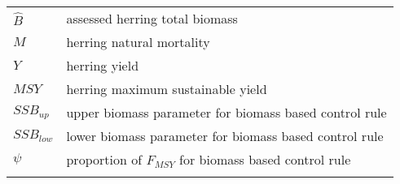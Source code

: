 \documentclass[]{article}
\begin{document}
\begin{longtable}[]{@{}ll@{}}
\begin{minipage}[t]{0.13\columnwidth}
\(\widehat{B}\)\strut
\end{minipage} & \begin{minipage}[t]{0.76\columnwidth}\raggedright\strut
assessed herring total biomass\strut
\end{minipage}\tabularnewline
\begin{minipage}[t]{0.13\columnwidth}\raggedright\strut
\(M\)\strut
\end{minipage} & \begin{minipage}[t]{0.76\columnwidth}\raggedright\strut
herring natural mortality\strut
\end{minipage}\tabularnewline
\begin{minipage}[t]{0.13\columnwidth}\raggedright\strut
\(Y\)\strut
\end{minipage} & \begin{minipage}[t]{0.76\columnwidth}\raggedright\strut
herring yield\strut
\end{minipage}\tabularnewline
\begin{minipage}[t]{0.13\columnwidth}\raggedright\strut
\(MSY\)\strut
\end{minipage} & \begin{minipage}[t]{0.76\columnwidth}\raggedright\strut
herring maximum sustainable yield\strut
\end{minipage}\tabularnewline
\begin{minipage}[t]{0.13\columnwidth}\raggedright\strut
\(SSB_{up}\)\strut
\end{minipage} & \begin{minipage}[t]{0.76\columnwidth}\raggedright\strut
upper biomass parameter for biomass based control rule\strut
\end{minipage}\tabularnewline
\begin{minipage}[t]{0.13\columnwidth}\raggedright\strut
\(SSB_{low}\)\strut
\end{minipage} & \begin{minipage}[t]{0.76\columnwidth}\raggedright\strut
lower biomass parameter for biomass based control rule\strut
\end{minipage}\tabularnewline
\begin{minipage}[t]{0.13\columnwidth}\raggedright\strut
\(\psi\)\strut
\end{minipage} & \begin{minipage}[t]{0.76\columnwidth}\raggedright\strut
proportion of \(F_{MSY}\) for biomass based control rule\strut
\end{minipage}\tabularnewline
\begin{minipage}[t]{0.13\columnwidth}\raggedright\strut

\end{minipage}
\end{longtable}
\end{document}
